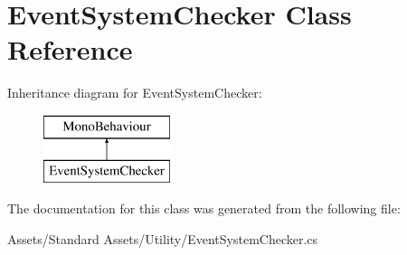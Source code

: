 \hypertarget{class_event_system_checker}{}\section{Event\+System\+Checker Class Reference}
\label{class_event_system_checker}
Inheritance diagram for Event\+System\+Checker\+:\begin{figure}[H]
\begin{center}
\leavevmode
\includegraphics[height=2.000000cm]{class_event_system_checker}
\end{center}
\end{figure}


The documentation for this class was generated from the following file\+:\begin{DoxyCompactItemize}
\item 
Assets/\+Standard Assets/\+Utility/Event\+System\+Checker.\+cs\end{DoxyCompactItemize}

